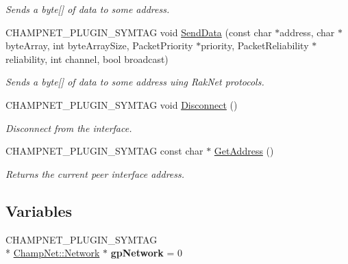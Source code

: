 \begin{DoxyCompactItemize}
\begin{DoxyCompactList}\small\item\em Sends a byte\mbox{[}\mbox{]} of data to some address. \end{DoxyCompactList}\item 
\hypertarget{namespace_champ_net_plugin_a50b06a48ff0ffb5f98dc98a8b29546ad}{C\-H\-A\-M\-P\-N\-E\-T\-\_\-\-P\-L\-U\-G\-I\-N\-\_\-\-S\-Y\-M\-T\-A\-G void \hyperlink{namespace_champ_net_plugin_a50b06a48ff0ffb5f98dc98a8b29546ad}{Send\-Data} (const char $\ast$address, char $\ast$byte\-Array, int byte\-Array\-Size, Packet\-Priority $\ast$priority, Packet\-Reliability $\ast$reliability, int channel, bool broadcast)}\label{namespace_champ_net_plugin_a50b06a48ff0ffb5f98dc98a8b29546ad}

\begin{DoxyCompactList}\small\item\em Sends a byte\mbox{[}\mbox{]} of data to some address uing Rak\-Net protocols. \end{DoxyCompactList}\item 
\hypertarget{namespace_champ_net_plugin_ad73dddb34e26ec660742e00a0d41fee5}{C\-H\-A\-M\-P\-N\-E\-T\-\_\-\-P\-L\-U\-G\-I\-N\-\_\-\-S\-Y\-M\-T\-A\-G void \hyperlink{namespace_champ_net_plugin_ad73dddb34e26ec660742e00a0d41fee5}{Disconnect} ()}\label{namespace_champ_net_plugin_ad73dddb34e26ec660742e00a0d41fee5}

\begin{DoxyCompactList}\small\item\em Disconnect from the interface. \end{DoxyCompactList}\item 
\hypertarget{namespace_champ_net_plugin_af5f2e2b6f71b6e0ddca62b9d7ed7e272}{C\-H\-A\-M\-P\-N\-E\-T\-\_\-\-P\-L\-U\-G\-I\-N\-\_\-\-S\-Y\-M\-T\-A\-G const char $\ast$ \hyperlink{namespace_champ_net_plugin_af5f2e2b6f71b6e0ddca62b9d7ed7e272}{Get\-Address} ()}\label{namespace_champ_net_plugin_af5f2e2b6f71b6e0ddca62b9d7ed7e272}

\begin{DoxyCompactList}\small\item\em Returns the current peer interface address. \end{DoxyCompactList}\end{DoxyCompactItemize}
\subsection*{Variables}
\begin{DoxyCompactItemize}
\item 
\hypertarget{namespace_champ_net_plugin_a6f246146f350188f1518f4dedb72f374}{C\-H\-A\-M\-P\-N\-E\-T\-\_\-\-P\-L\-U\-G\-I\-N\-\_\-\-S\-Y\-M\-T\-A\-G \\*
\hyperlink{class_champ_net_1_1_network}{Champ\-Net\-::\-Network} $\ast$ {\bfseries gp\-Network} = 0}\label{namespace_champ_net_plugin_a6f246146f350188f1518f4dedb72f374}

\end{DoxyCompactItemize}


